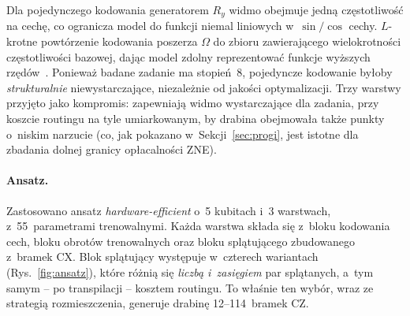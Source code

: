 \documentclass[11pt]{article}
\begin{document}
Dla pojedynczego kodowania generatorem $R_y$ widmo obejmuje jedną częstotliwość na cechę, co
ogranicza model do funkcji niemal liniowych w~$\sin/\cos$ cechy. $L$-krotne powtórzenie kodowania
poszerza $\Omega$ do zbioru zawierającego wielokrotności częstotliwości bazowej, dając model
zdolny reprezentować funkcje wyższych rzędów~\cite{schuld2021,perezsalinas2020}. Ponieważ badane
zadanie ma stopień~8, pojedyncze kodowanie byłoby \emph{strukturalnie} niewystarczające,
niezależnie od jakości optymalizacji. Trzy warstwy przyjęto jako kompromis: zapewniają widmo
wystarczające dla zadania, przy koszcie routingu na tyle umiarkowanym, by drabina obejmowała
także punkty o~niskim narzucie (co, jak pokazano w~Sekcji~\ref{sec:progi}, jest istotne dla
zbadania dolnej granicy opłacalności ZNE).

\paragraph{Ansatz.} Zastosowano ansatz \emph{hardware-efficient} o~5
kubitach i~3 warstwach, z~55~parametrami trenowalnymi. Każda warstwa składa się z~bloku kodowania
cech, bloku obrotów trenowalnych oraz bloku splątującego zbudowanego z~bramek CX. Blok splątujący
występuje w~czterech wariantach (Rys.~\ref{fig:ansatz}), które różnią się \emph{liczbą i~zasięgiem}
par splątanych, a~tym samym -- po transpilacji -- kosztem routingu. To właśnie ten wybór, wraz ze
strategią rozmieszczenia, generuje drabinę 12--114~bramek CZ.
\end{document}
